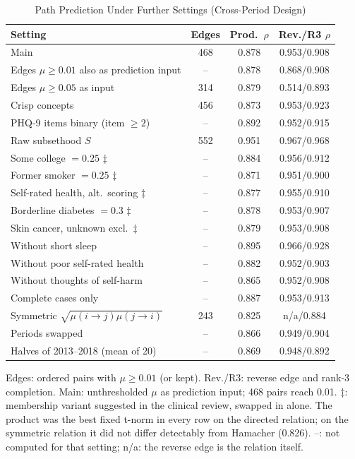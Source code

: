\documentclass[journal]{IEEEtran}
\begin{document}
\setcounter{table}{5}\begin{table}[!t]
\caption{Path Prediction Under Further Settings (Cross-Period Design)}
\centering
\scriptsize
\begin{tabular}{@{}l c c c@{}}
\toprule
Setting & Edges & Prod.\ $\rho$ & Rev./R3 $\rho$\\
\midrule
Main & 468 & 0.878 & 0.953/0.908\\
Edges $\mu\ge0.01$ also as prediction input & -- & 0.878 & 0.868/0.908\\
Edges $\mu\ge0.05$ as input & 314 & 0.879 & 0.514/0.893\\
Crisp concepts & 456 & 0.873 & 0.953/0.923\\
PHQ-9 items binary (item $\ge2$) & -- & 0.892 & 0.952/0.915\\
Raw subsethood $S$ & 552 & 0.951 & 0.967/0.968\\
Some college $=0.25$ $\ddagger$ & -- & 0.884 & 0.956/0.912\\
Former smoker $=0.25$ $\ddagger$ & -- & 0.871 & 0.951/0.900\\
Self-rated health, alt.\ scoring $\ddagger$ & -- & 0.877 & 0.955/0.910\\
Borderline diabetes $=0.3$ $\ddagger$ & -- & 0.878 & 0.953/0.907\\
Skin cancer, unknown excl.\ $\ddagger$ & -- & 0.879 & 0.953/0.908\\
Without short sleep & -- & 0.895 & 0.966/0.928\\
Without poor self-rated health & -- & 0.882 & 0.952/0.903\\
Without thoughts of self-harm & -- & 0.865 & 0.952/0.908\\
Complete cases only & -- & 0.887 & 0.953/0.913\\
Symmetric $\sqrt{\mu(i\to j)\mu(j\to i)}$ & 243 & 0.825 & n/a/0.884\\
Periods swapped & -- & 0.866 & 0.949/0.904\\
Halves of 2013--2018 (mean of 20) & -- & 0.869 & 0.948/0.892\\
\bottomrule
\end{tabular}

\smallskip
\parbox{\columnwidth}{\scriptsize Edges: ordered pairs with $\mu\ge0.01$ (or kept). Rev./R3: reverse edge and rank-3 completion. Main: unthresholded $\mu$ as prediction input; 468 pairs reach 0.01. $\ddagger$: membership variant suggested in the clinical review, swapped in alone. The product was the best fixed t-norm in every row on the directed relation; on the symmetric relation it did not differ detectably from Hamacher (0.826). --: not computed for that setting; n/a: the reverse edge is the relation itself.}
\end{table}
\end{document}
